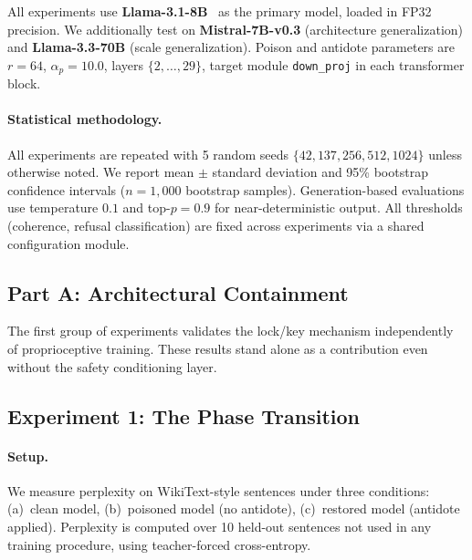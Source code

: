 \documentclass[10pt,letterpaper]{article}
\begin{document}
All experiments use \textbf{Llama-3.1-8B}~\citep{dubey2024llama} as the
primary model, loaded in FP32 precision. We additionally test on
\textbf{Mistral-7B-v0.3} (architecture generalization) and
\textbf{Llama-3.3-70B} (scale generalization). Poison and antidote
parameters are $r = 64$, $\alpha_p = 10.0$, layers $\{2, \ldots, 29\}$,
target module \texttt{down\_proj} in each transformer block.

\paragraph{Statistical methodology.}
All experiments are repeated with 5 random seeds
$\{42, 137, 256, 512, 1024\}$ unless otherwise noted. We report
mean $\pm$ standard deviation and 95\% bootstrap confidence intervals
($n = 1{,}000$ bootstrap samples). Generation-based evaluations use
temperature $0.1$ and top-$p = 0.9$ for near-deterministic output.
All thresholds (coherence, refusal classification) are fixed across
experiments via a shared configuration module.

\subsection*{Part A: Architectural Containment}

The first group of experiments validates the lock/key mechanism independently
of proprioceptive training. These results stand alone as a contribution even
without the safety conditioning layer.

\subsection{Experiment 1: The Phase Transition}
\label{sec:exp1}

\paragraph{Setup.}
We measure perplexity on WikiText-style sentences under three conditions:
(a)~clean model, (b)~poisoned model (no antidote), (c)~restored model
(antidote applied). Perplexity is computed over 10 held-out sentences not
used in any training procedure, using teacher-forced cross-entropy.
\end{document}
